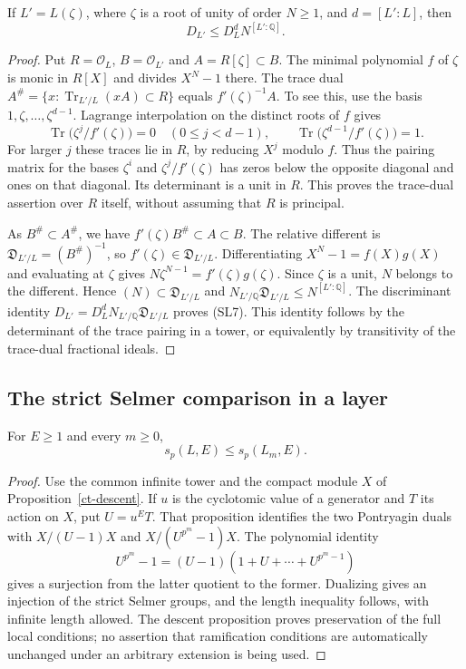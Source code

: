 \begin{lemma}\label{sl-cyclotomic-discriminant}
If $L'=L(\zeta)$, where $\zeta$ is a root of unity of order
$N\ge1$, and $d=[L':L]$, then
\[
                  D_{L'}\le D_L^d N^{[L':\mathbb Q]} .
                  \tag{SL7}
\]
\end{lemma}
\begin{proof}
Put $R=\mathcal O_L$, $B=\mathcal O_{L'}$ and
$A=R[\zeta]\subset B$.  The minimal polynomial $f$ of
$\zeta$ is monic in $R[X]$ and divides $X^N-1$ there.
The trace dual $A^\#=\{x:\operatorname{Tr}_{L'/L}(xA)
\subset R\}$ equals $f'(\zeta)^{-1}A$.
To see this, use the basis $1,\zeta,\ldots,\zeta^{d-1}$.
Lagrange interpolation on the distinct roots of $f$ gives
\[
 \operatorname{Tr}\bigl(\zeta^j/f'(\zeta)\bigr)
     =0\quad(0\le j<d-1),\qquad
 \operatorname{Tr}\bigl(\zeta^{d-1}/f'(\zeta)\bigr)=1.
\]
For larger $j$ these traces lie in $R$, by reducing $X^j$
modulo $f$.  Thus the pairing matrix for the bases
$\zeta^i$ and $\zeta^j/f'(\zeta)$ has zeros below the
opposite diagonal and ones on that diagonal.  Its determinant
is a unit in $R$.  This proves the trace-dual assertion over
$R$ itself, without assuming that $R$ is principal.

As $B^\#\subset A^\#$, we have
$f'(\zeta)B^\#\subset A\subset B$.
The relative different is
$\mathfrak D_{L'/L}=(B^\#)^{-1}$, so
$f'(\zeta)\in\mathfrak D_{L'/L}$.
Differentiating $X^N-1=f(X)g(X)$ and evaluating at $\zeta$
gives
$N\zeta^{N-1}=f'(\zeta)g(\zeta)$.
Since $\zeta$ is a unit, $N$ belongs to the different.
Hence $(N)\subset\mathfrak D_{L'/L}$ and
$N_{L'/\mathbb Q}\mathfrak D_{L'/L}\le N^{[L':\mathbb Q]}$.
The discriminant identity
$D_{L'}=D_L^d N_{L'/\mathbb Q}\mathfrak D_{L'/L}$
proves (SL7).  This identity follows by the determinant of
the trace pairing in a tower, or equivalently by transitivity
of the trace-dual fractional ideals.
\end{proof}

\subsection{The strict Selmer comparison in a layer}

\begin{proposition}\label{sl-selmer-monotonicity}
For $E\ge1$ and every $m\ge0$,
\[
                    s_p(L,E)\le s_p(L_m,E).
                    \tag{SL8}
\]
\end{proposition}
\begin{proof}
Use the common infinite tower and the compact module $X$
of Proposition~\ref{ct-descent}.  If $u$ is the cyclotomic
value of a generator and $T$ its action on $X$, put
$U=u^E T$.  That proposition identifies the two Pontryagin
duals with $X/(U-1)X$ and $X/(U^{p^m}-1)X$.
The polynomial identity
\[
 U^{p^m}-1=(U-1)(1+U+\cdots+U^{p^m-1})
\]
gives a surjection from the latter quotient to the former.
Dualizing gives an injection of the strict Selmer groups,
and the length inequality follows, with infinite length
allowed.  The descent proposition proves preservation of
the full local conditions; no assertion that ramification
conditions are automatically unchanged under an arbitrary
extension is being used.
\end{proof}

